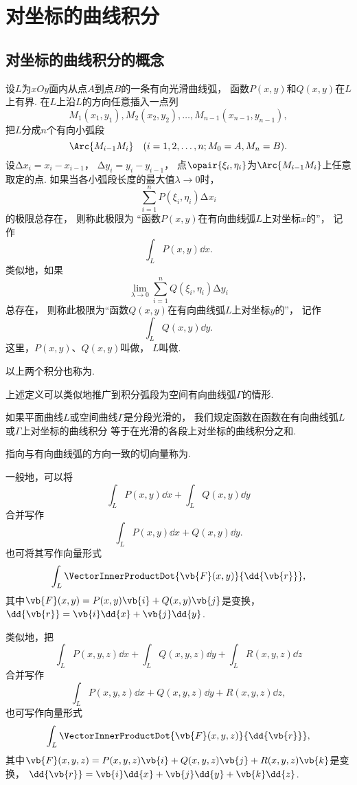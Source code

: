 \section{对坐标的曲线积分}
\subsection{对坐标的曲线积分的概念}
\begin{definition}
设\(L\)为\(xOy\)面内从点\(A\)到点\(B\)的一条有向光滑曲线弧，
函数\(P(x,y)\)和\(Q(x,y)\)在\(L\)上有界.
在\(L\)上沿\(L\)的方向任意插入一点列\[
	M_1(x_1,y_1),
	M_2(x_2,y_2),
	\dotsc,
	M_{n-1}(x_{n-1},y_{n-1}),
\]
把\(L\)分成\(n\)个有向小弧段\[
	\Arc{M_{i-1} M_i} \quad (i=1,2,\dotsc,n; M_0 = A, M_n = B).
\]
设\(\increment x_i = x_i - x_{i-1}\)，
\(\increment y_i = y_i - y_{i-1}\)，
点\(\opair{\xi_i,\eta_i}\)为\(\Arc{M_{i-1} M_i}\)上任意取定的点.
如果当各小弧段长度的最大值\(\lambda\to0\)时，\[
	\sum_{i=1}^n P(\xi_i,\eta_i) \increment x_i
\]的极限总存在，
则称此极限为
“函数\(P(x,y)\)在有向曲线弧\(L\)上对坐标\(x\)的”，
记作\[
	\int_L P(x,y) \dd{x}.
\]
类似地，如果\[
	\lim_{\lambda\to0} \sum_{i=1}^n Q(\xi_i,\eta_i) \increment y_i
\]总存在，
则称此极限为“函数\(Q(x,y)\)在有向曲线弧\(L\)上对坐标\(y\)的”，
记作\[
	\int_L Q(x,y) \dd{y}.
\]
这里，\(P(x,y)\)、\(Q(x,y)\)叫做，
\(L\)叫做.
\end{definition}
以上两个积分也称为.

上述定义可以类似地推广到积分弧段为空间有向曲线弧\(\Gamma\)的情形.

如果平面曲线\(L\)或空间曲线\(\Gamma\)是分段光滑的，
我们规定函数在函数在有向曲线弧\(L\)或\(\Gamma\)上对坐标的曲线积分
等于在光滑的各段上对坐标的曲线积分之和.

指向与有向曲线弧的方向一致的切向量称为.

一般地，可以将\[
	\int_L P(x,y) \dd{x} + \int_L Q(x,y) \dd{y}
\]合并写作\[
	\int_L P(x,y) \dd{x} + Q(x,y) \dd{y}.
\]
也可将其写作向量形式\[
	\int_L \VectorInnerProductDot{\vb{F}(x,y)}{\dd{\vb{r}}},
\]
其中\(\vb{F}(x,y) = P(x,y) \vb{i} + Q(x,y) \vb{j}\)是变换，
\(\dd{\vb{r}} = \vb{i} \dd{x} + \vb{j} \dd{y}\).

类似地，把\[
	\int_L P(x,y,z) \dd{x} + \int_L Q(x,y,z) \dd{y} + \int_L R(x,y,z) \dd{z}
\]合并写作\[
	\int_L P(x,y,z) \dd{x} + Q(x,y,z) \dd{y} + R(x,y,z) \dd{z},
\]
也可写作向量形式\[
	\int_L \VectorInnerProductDot{\vb{F}(x,y,z)}{\dd{\vb{r}}},
\]
其中\(\vb{F}(x,y,z) = P(x,y,z)\vb{i} + Q(x,y,z)\vb{j} + R(x,y,z)\vb{k}\)是变换，
\(\dd{\vb{r}} = \vb{i} \dd{x} + \vb{j} \dd{y} + \vb{k} \dd{z}\).

